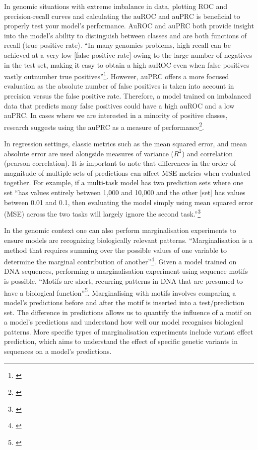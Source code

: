 \documentclass[
]{book}
\begin{document}
In genomic situations with extreme imbalance in data, plotting ROC and precision-recall curves and calculating the auROC and auPRC is beneficial to properly test your model's performance. AuROC and auPRC both provide insight into the model's ability to distinguish between classes and are both functions of recall (true positive rate). ``In many genomics problems, high recall can be achieved at a very low {[}false positive rate{]} owing to the large number of negatives in the test set, making it easy to obtain a high auROC even when false positives vastly outnumber true positives''\footnote{\citet{whalen2022}}. However, auPRC offers a more focused evaluation as the absolute number of false positives is taken into account in precision versus the false positive rate. Therefore, a model trained on imbalanced data that predicts many false positives could have a high auROC and a low auPRC. In cases where we are interested in a minority of positive classes, research suggests using the auPRC as a measure of performance\footnote{\citet{whalen2022}}.

In regression settings, classic metrics such as the mean squared error, and mean absolute error are used alongside measures of variance (\(R^2\)) and correlation (pearson correlation). It is important to note that differences in the order of magnitude of multiple sets of predictions can affect MSE metrics when evaluated together. For example, if a multi-task model has two prediction sets where one set ``has values entirely between 1,000 and 10,000 and the other {[}set{]} has values between 0.01 and 0.1, then evaluating the model simply using mean squared error (MSE) across the two tasks will largely ignore the second task.''\footnote{\citet{whalen2022}}

In the genomic context one can also perform marginalisation experiments to ensure models are recognizing biologically relevant patterns. ``Marginalisation is a method that requires summing over the possible values of one variable to determine the marginal contribution of another''\footnote{\citet{jonny2018}}. Given a model trained on DNA sequences, performing a marginalisation experiment using sequence motifs is possible. ``Motifs are short, recurring patterns in DNA that are presumed to have a biological function''\footnote{\citet{pat2006}}. Marginalising with motifs involves comparing a model's predictions before and after the motif is inserted into a test/prediction set. The difference in predictions allows us to quantify the influence of a motif on a model's predictions and understand how well our model recognises biological patterns. More specific types of marginalisation experiments include variant effect prediction, which aims to understand the effect of specific genetic variants in sequences on a model's predictions.
\end{document}
